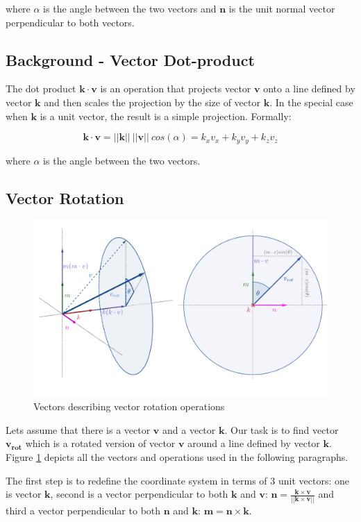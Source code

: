 where $\alpha$ is the angle between the two vectors and $\bm{n}$ is the unit normal vector perpendicular to both vectors.

\subsection{Background - Vector Dot-product}
The dot product $\bm{k} \cdot \bm{v}$ is an operation that projects vector $\bm{v}$ onto a line defined by vector $\bm{k}$ and then scales the projection by the size of vector $\bm{k}$. 
In the special case when $\bm{k}$ is a unit vector, the result is a simple projection. Formally:

$$\bm{k} \cdot \bm{v} = ||\bm{k}||~||\bm{v}||~cos(\alpha) = k_x v_x + k_y v_y + k_z v_z$$

where $\alpha$ is the angle between the two vectors.

\subsection{Vector Rotation}

\begin{figure}
    \centering
    \includegraphics[scale=3]{imgs_tomas/rodrigues_3d2d.png}
    \caption{Vectors describing vector rotation operations}
    \label{fig:rodrigues3d2d}
\end{figure}

Lets assume that there is a vector $\bm{v}$ and a vector $\bm{k}$. 
Our task is to find vector $\bm{v_{rot}}$ which is a rotated version of vector $\bm{v}$ around a line defined by vector $\bm{k}$. 
Figure \ref{fig:rodrigues3d2d} depicts all the vectors and operations used in the following paragraphs.

The first step is to redefine the coordinate system in terms of 3 unit vectors: one is vector $\bm{k}$, second is a vector perpendicular to both $\bm{k}$ and $\bm{v}$: $\bm{n} = \frac{\bm{k} \times \bm{v}}{||\bm{k} \times \bm{v}||}$ and third a vector perpendicular to both $\bm{n}$ and $\bm{k}$: $\bm{m} = \bm{n} \times \bm{k}$.

